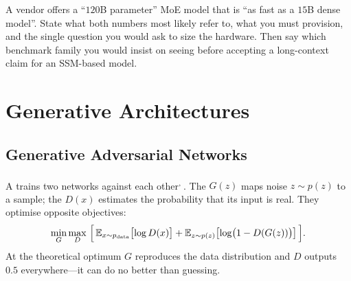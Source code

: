 \begin{checkpoint}
A vendor offers a ``$120$B parameter'' MoE model that is ``as fast as a $15$B
dense model''. State what both numbers most likely refer to, what you must
provision, and the single question you would ask to size the hardware. Then say
which benchmark family you would insist on seeing before accepting a
long-context claim for an SSM-based model.
\end{checkpoint}

\section{Generative Architectures}

\subsection{Generative Adversarial Networks}

A  trains two networks against each
other\textsuperscript{\cite{goodfellowGenerativeAdversarialNets2014},
\cite[][p.~125]{fleuretLittleBookDeep}}. The  $G(z)$ maps
noise $z\sim p(z)$ to a sample; the  $D(x)$ estimates the
probability that its input is real. They optimise opposite objectives:
\begin{equation}
  \min_G \max_D\ \Bigl[\,
    \mathbb{E}_{x\sim p_{\text{data}}}\bigl[\log D(x)\bigr]
    + \mathbb{E}_{z\sim p(z)}\bigl[\log\bigl(1 - D(G(z))\bigr)\bigr]
  \,\Bigr].
  \label{eq:dl-gan}
\end{equation}
At the theoretical optimum $G$ reproduces the data distribution and $D$ outputs
$0.5$ everywhere---it can do no better than guessing.

